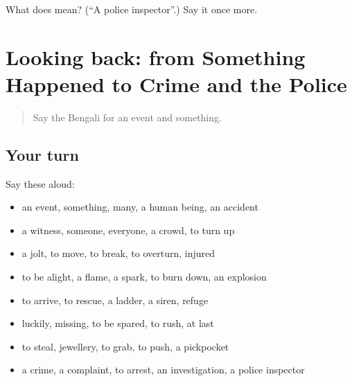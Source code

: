 \begin{tcolorbox}[breakable,colback=teal!4,colframe=teal!35!black,title={Before you move on}]
What does  mean? (\textquotedblleft{}A police inspector\textquotedblright{}.) Say it once more.
\end{tcolorbox}
\section[(dialogue)]{Looking back: from Something Happened to Crime and the Police}

\label{lesson:BN-R283-review-276-283}



\begin{quote}
Say the Bengali for an event and something.
\end{quote}

\subsection*{Your turn}
Say these aloud:

\begin{itemize}
\raggedright
  \item an event, something, many, a human being, an accident
  \item a witness, someone, everyone, a crowd, to turn up
  \item a jolt, to move, to break, to overturn, injured
  \item to be alight, a flame, a spark, to burn down, an explosion
  \item to arrive, to rescue, a ladder, a siren, refuge
  \item luckily, missing, to be spared, to rush, at last
  \item to steal, jewellery, to grab, to push, a pickpocket
  \item a crime, a complaint, to arrest, an investigation, a police inspector
\end{itemize}

